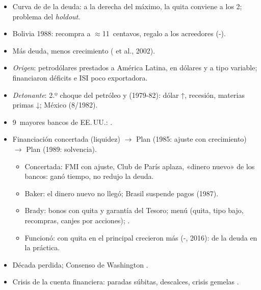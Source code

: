 \documentclass{article}
\begin{document}
\begin{columnas}
\begin{itemize}
\item Curva de  de la deuda: a la derecha del máximo, la quita conviene a los 2; problema del \emph{holdout}.
\end{itemize}
\begin{itemize}
\item Bolivia 1988: recompra a $\approx$11~centavos, regalo a los acreedores (-).
\item Más deuda, menos crecimiento ( et al., 2002).
\end{itemize}
\begin{itemize}
\item \emph{Origen}: petrodólares prestados a América Latina, en dólares y a tipo variable; financiaron déficits e ISI poco exportadora.
\item \emph{Detonante}: 2.º choque del petróleo y  (1979-82): dólar ↑, recesión, materias primas ↓; México (8/1982).
\item 9~mayores bancos de EE.\,UU.: .
\item Financiación concertada (liquidez) $\to$ Plan  (1985: ajuste con crecimiento) $\to$ Plan  (1989: solvencia).
  \begin{itemize}
  \item Concertada: FMI con ajuste, Club de París aplaza, «dinero nuevo» de los bancos: ganó tiempo, no redujo la deuda.
  \item Baker: el dinero nuevo no llegó; Brasil suspende pagos (1987).
  \item Brady: bonos con quita y garantía del Tesoro; menú (quita, tipo bajo, recompras, canjes por acciones); .
  \item Funcionó: con quita en el principal crecieron más (-, 2016):  de la deuda en la práctica.
  \end{itemize}
\item Década perdida; Consenso de Washington .
\end{itemize}
\begin{itemize}
\item Crisis de la cuenta financiera: paradas súbitas, descalces, crisis gemelas .

\end{itemize}
\end{columnas}
\end{document}

